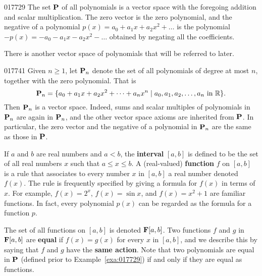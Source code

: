 \begin{example}{}{017729}
The set $\textbf{P}$ of all polynomials is a vector space with the foregoing addition and scalar multiplication. The zero vector is the zero polynomial, and the negative of a polynomial $p(x) = a_{0} + a_{1}x + a_{2}x^{2} + \dots$ is the polynomial $-p(x) = -a_{0} - a_{1}x - a_{2}x^{2} - \dots$ obtained by negating all the coefficients.
\end{example}

\noindent There is another vector space of polynomials that will be referred to later.

\begin{example}{}{017741}
Given $n \geq 1$, let $\textbf{P}_{n}$ denote the set of all polynomials of degree at most $n$, together with the zero polynomial. That is 
\begin{equation*}
\textbf{P}_n = \{a_0 + a_1x + a_2x^2 + \dots + a_nx^n \mid a_0, a_1, a_2, \dots, a_n \mbox{ in } \mathbb{R}\}.
\end{equation*}
Then $\textbf{P}_{n}$ is a vector space. Indeed, sums and scalar multiples of polynomials in $\textbf{P}_{n}$ are again in $\textbf{P}_{n}$, and the other vector space axioms are inherited from $\textbf{P}$. In particular, the zero vector and the negative of a polynomial in $\textbf{P}_{n}$ are the same as those in $\textbf{P}$.
\end{example}

If $a$ and $b$ are real numbers and $a < b$, the \textbf{interval} $[a, b]$ is defined to be the set of all real numbers $x$ such that $a \leq x \leq b$. A (real-valued) \textbf{function} $f$ on $[a, b]$ is a rule that associates to every number $x$ in $[a, b]$ a real number denoted $f(x)$. The rule is frequently specified by giving a formula for $f(x)$ in terms of $x$. For example, $f(x) = 2^{x}$, $f(x) = \sin x$, and $f(x) = x^{2} + 1$ are familiar functions. In fact, every polynomial $p(x)$ can be regarded as the formula for a function $p$.

\begin{wrapfigure}[9]{l}{5cm}
	\centering
	
\end{wrapfigure}



The set of all functions on $[a, b]$ is denoted $\textbf{F}[a, b]$. Two
functions $f$ and $g$ in $\textbf{F}[a, b]$ are \textbf{equal} if $f(x) = g(x)$ for every $x$ in $[a, b]$, and we describe this by saying that $f$ and $g$ have the \textbf{same action}. Note that two polynomials are equal in $\textbf{P}$ (defined prior to Example~\ref{exa:017729}) if and only if they are equal as functions.


